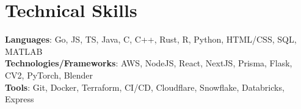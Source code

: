 \documentclass[letterpaper,11pt]{article}
\makeatletter
\newcommand{\resumeItem}[1]{
  \item\small{
    {#1 \vspace{-2pt}}
  }
}
\newcommand{\resumeSubheading}[4]{
  \vspace{-2pt}\item
    \begin{tabular*}{1.0\textwidth}[t]{l@{\extracolsep{\fill}}r}
      \small#1 & \textbf{\small #2} \\
      \textit{\small#3} & \textit{\small #4} \\
    \end{tabular*}\vspace{-9pt}
}
\newcommand{\resumeSubHeadingListStart}{\begin{itemize}[leftmargin=0.0in, label={}]}
\newcommand{\resumeItemListStart}{\begin{itemize}}
\newcommand{\resumeItemListEnd}{\end{itemize}\vspace{-5pt}}
\makeatother
\begin{document}
\section{Technical Skills}
 \begin{itemize}[leftmargin=0.15in, label={}]
    \small{\item{
      \begin{comment}
        Languages:
        - Go
        - JavaScript
        - TypeScript
        - C
        - C++
        - Java
        - Rust
        - R
        - Python
        - HTML/CSS
        - SQL
        - MATLAB

        Technologies/Frameworks:
        - Linux
        - Bootstrap
        - NextJS
        - React
        - Prisma
        - Flask
        - Node
        - CV2
        - AWS
        - PyTorch
        - Blender

        Tools:
        - Git
        - Docker
        - Terraform
        - CI/CD
        - AWS
        - Cloudflare
        - Snowflake
        - Databricks
        - Express
      \end{comment}
      \textbf{Languages}{: Go, JS, TS, Java, C, C++, Rust, R, Python, HTML/CSS, SQL, MATLAB} \\
      \textbf{Technologies/Frameworks}{: AWS, NodeJS, React, NextJS, Prisma, Flask, CV2, PyTorch, Blender} \\
      \textbf{Tools}{: Git, Docker, Terraform, CI/CD, Cloudflare, Snowflake, Databricks, Express} \\
    }}
 \end{itemize}
\vspace{-15pt}


        
\end{document}

